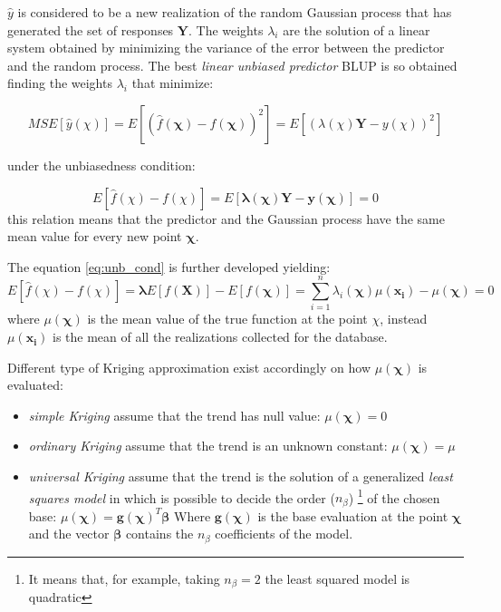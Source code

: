 $\hat{y}$ is considered to be a new realization of the random Gaussian process that has generated the set of responses $\mathbf{Y}$.
The weights $\lambda_i$ are the solution of a linear system obtained by minimizing the variance of the error between the predictor and the random process.
The best \textit{linear unbiased predictor} BLUP is so obtained finding the weights $\lambda_i$ that minimize:

\begin{equation}
MSE[\hat{y}(\chi)] =  E \left[\left( \hat{f}(\boldsymbol{\chi})  -f(\boldsymbol{\chi}) \right)^2\right] = E \left[\left(\lambda(\chi)\mathbf{Y} -y(\chi)\right)^2\right]
\label{eq:var_err}
\end{equation}

under the unbiasedness condition:

\begin{equation}
E \left[ \hat{f}(\chi)  -f(\chi)\right] =  E \left[ \boldsymbol{\lambda}(\boldsymbol{\chi})\mathbf{Y} -\mathbf{y}(\boldsymbol{\chi})  \right] = 0
\label{eq:unb_cond}
\end{equation}
this relation means that the predictor and the Gaussian process have the same mean value for every new point $\boldsymbol{\chi}$.

The equation \eqref{eq:unb_cond} is further developed yielding:
\begin{equation}
E \left[ \hat{f}(\chi)  -f(\chi)\right] = \boldsymbol{\lambda} E \left[ f(\mathbf{X})  \right] - E \left[ f(\boldsymbol{\chi})  \right] = \sum_{i=1}^{n} \lambda_i(\boldsymbol{\chi}) \mu(\mathbf{x_i}) - \mu(\boldsymbol{\chi}) = 0
\label{eq:unb_cond2}
\end{equation}
where $\mu(\boldsymbol{\chi})$ is the mean value of the true function at the point $\chi$, instead $\mu(\mathbf{x_i})$ is the mean of all the realizations collected for the database.

Different type of Kriging approximation exist accordingly on how $\mu(\boldsymbol{\chi})$ is evaluated:
\begin{itemize}
	\item \textit{simple Kriging} assume that the trend has null value: $\mu(\boldsymbol{\chi}) = 0$
	\item \textit{ordinary Kriging} assume that the trend is an unknown constant: $\mu(\boldsymbol{\chi}) = \mu$
	\item \textit{universal Kriging} assume that the trend is the solution of a generalized \textit{least squares model} in which is possible to decide the order ($n_{\beta}$) \footnote{It means that, for example, taking $n_{\beta}= 2$ the least squared model is quadratic} of the chosen base: $\mu(\boldsymbol{\chi}) = \mathbf{g}(\boldsymbol{\chi})^T \boldsymbol{\beta}$
	Where $\mathbf{g}(\boldsymbol{\chi})$ is the base evaluation at the point $\boldsymbol{\chi}$ and the vector $\boldsymbol{\beta}$ contains the $n_{\beta}$ coefficients of the model.
\end{itemize}

